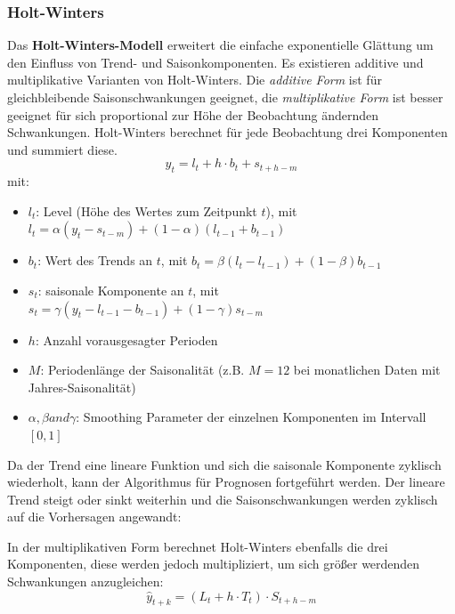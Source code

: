 \subsubsection{Holt-Winters}
Das \textbf{Holt-Winters-Modell} erweitert die einfache exponentielle Glättung um den Einfluss von Trend- und Saisonkomponenten. Es existieren additive und multiplikative Varianten von Holt-Winters. Die \textit{additive Form} ist für gleichbleibende Saisonschwankungen geeignet, die \textit{multiplikative Form} ist besser geeignet für sich proportional zur Höhe der Beobachtung ändernden Schwankungen. Holt-Winters berechnet für jede Beobachtung drei Komponenten und summiert diese.
\begin{equation}
y_{t} = l_t + h \cdot b_t + s_{t+h-m}
\end{equation}
mit:
\begin{itemize}
    \item $l_t$: Level (Höhe des Wertes zum Zeitpunkt $t$), mit $l_t=\alpha(y_t-s_{t-m})+(1-\alpha)(l_{t-1}+b_{t-1})$
    \item $b_t$: Wert des Trends an $t$, mit $b_t=\beta (l_t-l_{t-1})+(1-\beta)b_{t-1}$
    \item $s_t$: saisonale Komponente an $t$, mit $s_t=\gamma(y_t-l_{t-1}-b_{t-1})+(1-\gamma)s_{t-m}$
    \item $h$: Anzahl vorausgesagter Perioden
    \item $M$: Periodenlänge der Saisonalität (z.B. $M = 12$ bei monatlichen Daten mit Jahres-Saisonalität)
    \item $\alpha, \beta and \gamma$: Smoothing Parameter der einzelnen Komponenten im Intervall $[0, 1]$
\end{itemize}
Da der Trend eine lineare Funktion und sich die saisonale Komponente zyklisch wiederholt, kann der Algorithmus für Prognosen fortgeführt werden. Der lineare Trend steigt oder sinkt weiterhin und die Saisonschwankungen werden zyklisch auf die Vorhersagen angewandt:

In der multiplikativen Form berechnet Holt-Winters ebenfalls die drei Komponenten, diese werden jedoch multipliziert, um sich größer werdenden Schwankungen anzugleichen:
\begin{equation}
\hat{y}_{t+k} = (L_t + h \cdot T_t) \cdot S_{t+h-m}
\end{equation}


